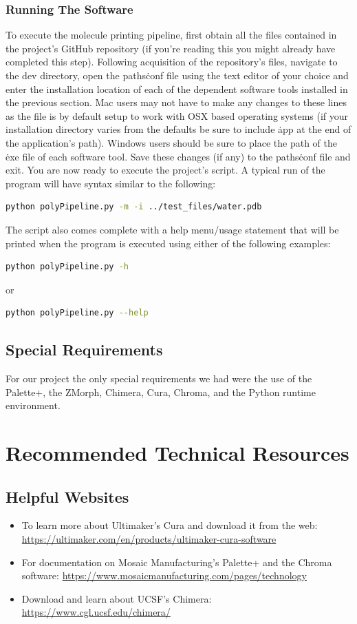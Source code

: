\documentclass[letterpaper, onecolumn, draftclsnofoot, 10pt, compsoc]{IEEEtran}
\begin{document}
\begin{singlespace}
	\subsubsection{Running The Software}
	To execute the molecule printing pipeline, first obtain all the files contained in the project's GitHub repository (if you're reading this you might already have completed this step). Following acquisition of the repository's files, navigate to the dev\/ directory, open the paths\.conf file using the text editor of your choice and enter the installation location of each of the dependent software tools installed in the previous section. Mac users may not have to make any changes to these lines as the file is by default setup to work with OSX based operating systems (if your installation directory varies from the defaults be sure to include \.app at the end of the application's path). Windows users should be sure to place the path of the \.exe file of each software tool. Save these changes (if any) to the paths\.conf file and exit. You are now ready to execute the project's script. A typical run of the program will have syntax similar to the following: 
	\begin{lstlisting}[language=bash]
	python polyPipeline.py -m -i ../test_files/water.pdb
	\end{lstlisting}
	The script also comes complete with a help menu/usage statement that will be printed when the program is executed using either of the following examples: 
	\begin{lstlisting}[language=bash]
	python polyPipeline.py -h
	\end{lstlisting}
	or
	\begin{lstlisting}[language=bash]
	python polyPipeline.py --help
	\end{lstlisting}
	
	\subsection{Special Requirements}
	For our project the only special requirements we had were the use of the Palette+, the ZMorph, Chimera, Cura, Chroma, and the Python runtime environment.
	
	\section{Recommended Technical Resources} %
	\subsection{Helpful Websites}
	\begin{itemize}
	\item To learn more about Ultimaker's Cura and download it from the web: \url{https://ultimaker.com/en/products/ultimaker-cura-software}
	\item For documentation on Mosaic Manufacturing's Palette+ and the Chroma software: \url{https://www.mosaicmanufacturing.com/pages/technology}
	\item Download and learn about UCSF's Chimera: \url{https://www.cgl.ucsf.edu/chimera/}
	\end{itemize}

\end{singlespace}
\end{document}
